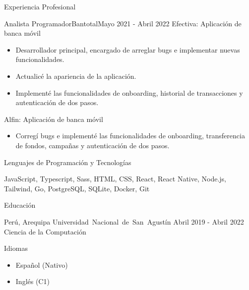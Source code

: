 \documentclass[]{mcdowell-cv/mcdowellcv}
\begin{document}
\begin{cvsection}{Experiencia Profesional}
        \begin{cvsubsection}{Analista Programador}{Bantotal}{Mayo 2021 - Abril 2022}
            Efectiva: Aplicación de banca móvil
            \begin{itemize}
                \item Desarrollador principal, encargado de arreglar bugs e implementar nuevas funcionalidades.
                \item Actualicé la apariencia de la aplicación.
                \item Implementé las funcionalidades de onboarding, historial de transacciones y autenticación de dos pasos.
            \end{itemize}

            Alfin: Aplicación de banca móvil
            \begin{itemize}
                \item Corregí bugs e implementé las funcionalidades de onboarding, transferencia de fondos, campañas y autenticación de dos pasos.
            \end{itemize}

        \end{cvsubsection}
    \end{cvsection}

    \begin{cvsection}{Lenguajes de Programación y Tecnologías}
        \begin{cvsubsection}{}{}{}
            JavaScript, Typescript, Sass, HTML, CSS, React, React Native, Node.js, Tailwind, Go, PostgreSQL, SQLite, Docker, Git
        \end{cvsubsection}
    \end{cvsection}

    \begin{cvsection}{Educación}
        \begin{cvsubsection}
        {Perú, Arequipa}
        {\mbox{Universidad Nacional de San Agustín}}
        {Abril 2019 - Abril 2022}
            Ciencia de la Computación
        \end{cvsubsection}
    \end{cvsection}

    \begin{cvsection}{Idiomas}
        \begin{cvsubsection}{}{}{}
            \begin{itemize}
                \item Español (Nativo)
                \item Inglés (C1)
            \end{itemize}
        \end{cvsubsection}
    \end{cvsection}
\end{document}
